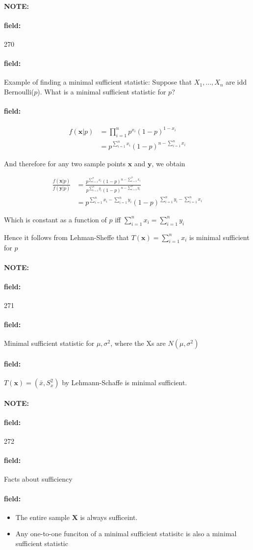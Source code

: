 \documentclass[12pt]{article}
\newenvironment{note}{\paragraph{NOTE:}}{}
\newenvironment{field}{\paragraph{field:}}{}
\begin{document}
\begin{note} \begin{field} \tiny 270 \end{field}
  \begin{field}
    Example of finding a minimal sufficient statistic:
    Suppose that $X_1, \ldots , X_n$ are idd Bernoulli($p$). What is a minimal sufficient statistic for $p$?
  \end{field}
  \begin{field}
    \begin{align*}
      f(\mathbf{x}|p) &= \prod_{i = 1}^n p^{x_i}(1-p)^{1 - x_i}\\
      &= p^{\sum _{i = 1}^n x_i}(1-p)^{n - \sum _{i = 1}^nx_i}
    \end{align*}

    And therefore for any two sample points $\mathbf{x}$ and $\mathbf{y}$, we obtain

    \begin{align*}
      \frac{f(\mathbf{x}|p)}{f(\mathbf{y}|p)} &= \frac{p^{\sum _{i = 1}^n x_i}(1-p)^{n - \sum _{i = 1}^nx_i}}{p^{\sum _{i = 1}^n y_i}(1-p)^{n - \sum _{i = 1}^ny_i}}\\
      &= p^{\sum _{i = 1}^n x_i - \sum _{i = 1}^n y_i}(1-p)^{\sum _{i = 1}^n y_i - \sum _{i = 1}^nx_i}
    \end{align*}

    Which is constant as a function of $p$ iff $\sum _{i = 1}^n x_i = \sum _{i = 1}^n y_i$

    Hence it follows from Lehman-Sheffe that $T(\mathbf{x}) = \sum _{i = 1}^n x_i$ is minimal sufficient for $p$
  \end{field}
\end{note}

\begin{note} \begin{field} \tiny 271 \end{field}
  \begin{field}
    Minimal sufficient statistic for $\mu,\sigma^2$, where the Xs are $N(\mu,\sigma^2)$
  \end{field}
  \begin{field}
    $T(\mathbf{x}) = (\bar{x},S_x^2)$ by Lehmann-Schaffe is minimal sufficient.
  \end{field}
\end{note}

\begin{note} \begin{field} \tiny 272 \end{field}
  \begin{field}
    Facts about sufficiency
  \end{field}
  \begin{field}
    \begin{itemize}
      \item The entire sample $\mathbf{X}$ is always sufficeint.
      \item Any one-to-one funciton of a minimal sufficient statisitc is also a minimal sufficient statistic
    \end{itemize}
  \end{field}
\end{note}
\end{document}
